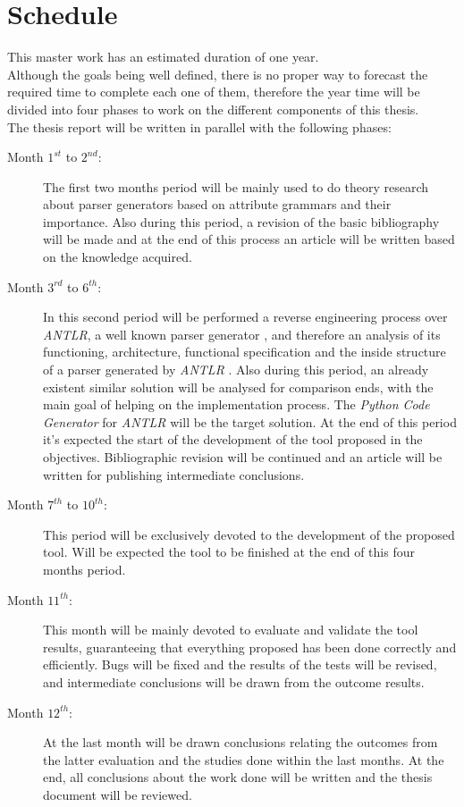 \documentclass[a4paper,12pt]{article}
\begin{document}
\section{\Large Schedule}
This master work has an estimated duration of one year.\\[6pt]
Although the goals being well defined, there is no proper way to forecast the required time to complete each one of them, therefore the year time will be divided into four phases to work on the different components of this thesis.\\[6pt]
The thesis report will be written in parallel with the following phases:
\begin{description}
\item[Month $1^{st}$ to $2^{nd}$:] The first two months period will be mainly used to do theory research about parser generators \cite{WC93,WG84a,GHea90b} based on attribute grammars \cite{ASU86a,Wai90} and their importance. Also during this period, a revision of the basic bibliography will be made and at the end of this process an article will be written based on the knowledge acquired.
\item[Month $3^{rd}$ to $6^{th}$:] In this second period will be performed a reverse engineering process over \emph{ANTLR}, a well known parser generator \cite{Par07}, and therefore an analysis of its functioning, architecture, functional specification and the inside structure of a parser generated by \emph{ANTLR} \cite{Par07,PQ95}. Also during this period, an already existent similar solution will be analysed for comparison ends, with the main goal of helping on the implementation process. The \emph{Python Code Generator} for \emph{ANTLR} will be the target solution. At the end of this period it's expected the start of the development of the tool proposed in the objectives. Bibliographic revision will be continued and an article will be written for publishing intermediate conclusions.
\item[Month $7^{th}$ to $10^{th}$:] This period will be exclusively devoted to the development of the proposed tool. Will be expected the tool to be finished at the end of this four months period.
\item[Month $11^{th}$:] This month will be mainly devoted to evaluate and validate the tool results, guaranteeing that everything proposed has been done correctly and efficiently. Bugs will be fixed and the results of the tests will be revised, and intermediate conclusions will be drawn from the outcome results.
\item[Month $12^{th}$:] At the last month will be drawn conclusions relating the outcomes from the latter evaluation and the studies done within the last months. At the end, all conclusions about the work done will be written and the thesis document will be reviewed.
\end{description}



\end{document}
